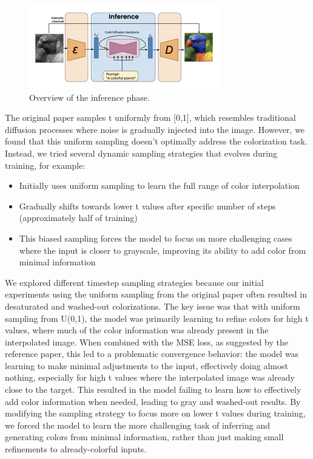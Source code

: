 \documentclass[10pt,twocolumn,letterpaper]{article}
\begin{document}
\begin{figure}[t]
    \centering
    \includegraphics[width=0.8\linewidth]{TrainingAndInference_2.png}
    \caption{Overview of the inference phase.}
    \label{fig:inference}
\end{figure}
The original paper samples t uniformly from [0,1], which resembles traditional diffusion processes where noise is gradually injected into the image. However, we found that this uniform sampling doesn't optimally address the colorization task. Instead, we tried several dynamic sampling strategies that evolves during training, for example:
\begin{itemize}
\item Initially uses uniform sampling to learn the full range of color interpolation
\item Gradually shifts towards lower t values after specific number of steps (approximately half of training)
\item This biased sampling forces the model to focus on more challenging cases where the input is closer to grayscale, improving its ability to add color from minimal information
\end{itemize}

We explored different timestep sampling strategies because our initial experiments using the uniform sampling from the original paper often resulted in desaturated and washed-out colorizations. The key issue was that with uniform sampling from U(0,1), the model was primarily learning to refine colors for high t values, where much of the color information was already present in the interpolated image. When combined with the MSE loss, as suggested by the reference paper, this led to a problematic convergence behavior: the model was learning to make minimal adjustments to the input, effectively doing almost nothing, especially for high t values where the interpolated image was already close to the target. This resulted in the model failing to learn how to effectively add color information when needed, leading to gray and washed-out results. By modifying the sampling strategy to focus more on lower t values during training, we forced the model to learn the more challenging task of inferring and generating colors from minimal information, rather than just making small refinements to already-colorful inputs.
\end{document}
